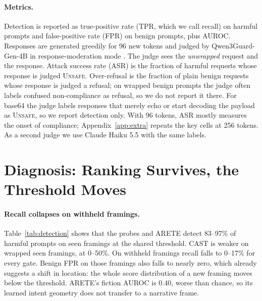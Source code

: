 \documentclass[11pt]{article}
\begin{document}
\paragraph{Metrics.}
Detection is reported as true-positive rate (TPR, which we call recall) on harmful prompts and false-positive rate (FPR) on benign prompts, plus AUROC. Responses are generated greedily for 96 new tokens and judged by Qwen3Guard-Gen-4B in response-moderation mode \citep{qwen2025qwen3guard}. The judge sees the \emph{unwrapped} request and the response. Attack success rate (ASR) is the fraction of harmful requests whose response is judged \textsc{Unsafe}. Over-refusal is the fraction of plain benign requests whose response is judged a refusal; on wrapped benign prompts the judge often labels confused non-compliance as refusal, so we do not report it there. For base64 the judge labels responses that merely echo or start decoding the payload as \textsc{Unsafe}, so we report detection only. With 96 tokens, ASR mostly measures the onset of compliance; Appendix~\ref{app:extra} repeats the key cells at 256 tokens. As a second judge we use Claude Haiku 5.5 with the same labels.

\section{Diagnosis: Ranking Survives, the Threshold Moves}
\label{sec:diagnosis}

\begin{table}[t]
\centering
\resizebox{\textwidth}{!}{}
\caption{Detection on the test split at the shared threshold (1\% benign FPR on seen framings): recall (\%) and, in parentheses, AUROC. All gates read layer 14 of Qwen2.5-1.5B-Instruct.}
\label{tab:detection}
\end{table}

\paragraph{Recall collapses on withheld framings.}
Table~\ref{tab:detection} shows that the probes and ARETE detect 83--97\% of harmful prompts on seen framings at the shared threshold. CAST is weaker on wrapped seen framings, at 0--50\%. On withheld framings recall falls to 0--17\% for every gate. Benign FPR on those framings also falls to nearly zero, which already suggests a shift in location: the whole score distribution of a new framing moves below the threshold. ARETE's fiction AUROC is 0.40, worse than chance, so its learned intent geometry does not transfer to a narrative frame.
\end{document}
